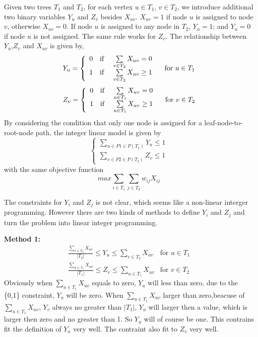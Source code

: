 Given two trees $T_1$ and $T_2$, for each vertex $u \in T_1$, $v \in T_2$, we introduce additional two binary variables $Y_u$ and $Z_v$ besides $X_{uv}$. $X_{uv} = 1$ if node $u$ is assigned to node $v$, otherwise $X_{uv} = 0$. If node $u$ is assigned to any node in $T_2$, $Y_u = 1$; and $Y_u = 0$ if node $u$ is not assigned. The same rule works for $Z_v$. The relationship between $Y_u$,$Z_v$ and $X_{uv}$ is given by,
\begin{equation}
	Y_u = 
	\left\{
	\begin{array}{cc}
		0 & \text{if \quad $\sum\limits_{v \in T_2}X_{uv} = 0$} \\
		1 & \text{if \quad $\sum\limits_{v \in T_2}X_{uv} \ge 1$}
	\end{array}
	\right.
	\quad \text{for $u \in T_1$}
\end{equation}
\begin{equation}
	Z_v = 
	\left\{
	\begin{array}{cc}
		0 & \text{if \quad $\sum\limits_{u \in T_1}X_{uv} = 0$} \\
		1 & \text{if \quad $\sum\limits_{u \in T_1}X_{uv} \ge 1$}
	\end{array}
	\right.
	\quad \text{for $v \in T_2$}
\end{equation}
By considering the condition that only one node is assigned for a leaf-node-to-root-node path, the integer linear model is given by
\begin{equation}
\left\{
\begin{array}{l}
\sum\limits_{u \in P1 \in P(T_1)}Y_u \le  1 \\
\sum\limits_{v \in P2 \in P(T_2)}Z_v \le  1 
\end{array}
\right.
\end{equation}
with the same objective function
\begin{equation}
max\sum\limits_{i \in T_1}\sum\limits_{j \in T_2}w_{ij}X_{ij}
\end{equation}

The constraints for $Y_i$ and $Z_j$ is not clear, which seems like a non-linear interger programming. However there are two kinds of methods to define $Y_i$ and $Z_j$ and turn the problem into linear integer programming.

\textbf{Method 1:}
\begin{eqnarray}
\frac{\sum_{v \in T_2}X_{uv}}{|T_2|} \le Y_u \le \sum_{v \in T_2}X_{uv} & \text{for $u \in T_1$} \\
\frac{\sum_{u \in T_1}X_{uv}}{|T_1|} \le Z_v \le \sum_{u \in T_1}X_{uv} & \text{for $v \in T_2$}
\end{eqnarray}
Obviously when $\sum\limits_{u \in T_1}X_{uv}$ equals to zero, $Y_u$ will less than zero, due to the \{0,1\} constraint, $Y_u$ will be zero. When $\sum\limits_{u \in T_1}X_{uv}$ larger than zero,beacuse of $\sum\limits_{u \in T_1}X_{uv}$, $Y_v$ always no greater than $|T_1|$, $Y_u$ will larger then a value, which is larger then zero and no greater than 1. So $Y_u$ will of course be one. This contrains fit the definition of $Y_u$ very well. The contraint also fit to $Z_v$ very well.

